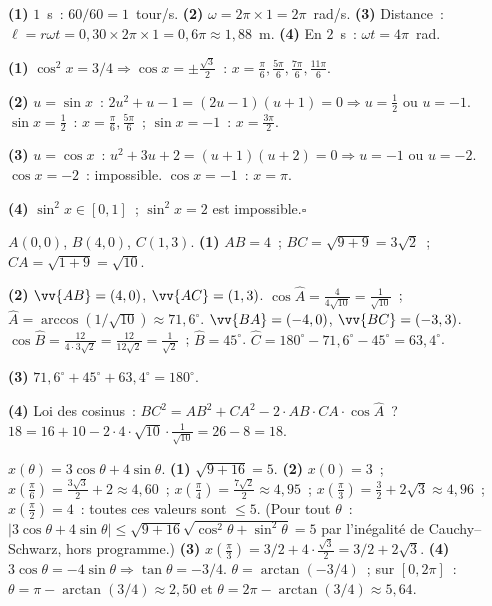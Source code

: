 
\textbf{(1)} $1$~s~: $60/60=1$~tour/s.
\textbf{(2)} $\omega=2\pi\times1=2\pi$~rad/s.
\textbf{(3)} Distance~: $\ell=r\omega t=0{,}30\times2\pi\times1=0{,}6\pi\approx1{,}88$~m.
\textbf{(4)} En $2$~s~: $\omega t=4\pi$~rad.


\textbf{(1)} $\cos^2x=3/4\Rightarrow\cos x=\pm\frac{\sqrt{3}}{2}$~:
$x=\frac{\pi}{6},\frac{5\pi}{6},\frac{7\pi}{6},\frac{11\pi}{6}$.

\textbf{(2)} $u=\sin x$~: $2u^2+u-1=(2u-1)(u+1)=0\Rightarrow u=\frac{1}{2}$ ou $u=-1$.
$\sin x=\frac{1}{2}$~: $x=\frac{\pi}{6},\frac{5\pi}{6}$~; $\sin x=-1$~: $x=\frac{3\pi}{2}$.

\textbf{(3)} $u=\cos x$~: $u^2+3u+2=(u+1)(u+2)=0\Rightarrow u=-1$ ou $u=-2$.
$\cos x=-2$~: impossible. $\cos x=-1$~: $x=\pi$.

\textbf{(4)} $\sin^2x\in[0,1]$~; $\sin^2x=2$ est impossible.\hfill$\square$


$A(0,0)$, $B(4,0)$, $C(1,3)$.
\textbf{(1)} $AB=4$~; $BC=\sqrt{9+9}=3\sqrt{2}$~; $CA=\sqrt{1+9}=\sqrt{10}$.

\textbf{(2)} $\vv{AB}=(4,0)$, $\vv{AC}=(1,3)$.
$\cos\hat{A}=\frac{4}{4\sqrt{10}}=\frac{1}{\sqrt{10}}$~; $\hat{A}=\arccos(1/\sqrt{10})\approx71{,}6^{\circ}$.
$\vv{BA}=(-4,0)$, $\vv{BC}=(-3,3)$.
$\cos\hat{B}=\frac{12}{4\cdot3\sqrt{2}}=\frac{12}{12\sqrt{2}}=\frac{1}{\sqrt{2}}$~; $\hat{B}=45^{\circ}$.
$\hat{C}=180^{\circ}-71{,}6^{\circ}-45^{\circ}=63{,}4^{\circ}$.

\textbf{(3)} $71{,}6^{\circ}+45^{\circ}+63{,}4^{\circ}=180^{\circ}$.\checkmark

\textbf{(4)} Loi des cosinus~: $BC^2=AB^2+CA^2-2\cdot AB\cdot CA\cdot\cos\hat{A}$~?
$18=16+10-2\cdot4\cdot\sqrt{10}\cdot\frac{1}{\sqrt{10}}=26-8=18$.\checkmark


$x(\theta)=3\cos\theta+4\sin\theta$.
\textbf{(1)} $\sqrt{9+16}=5$.
\textbf{(2)} $x(0)=3$~; $x(\frac\pi6)=\frac{3\sqrt3}{2}+2\approx4{,}60$~; $x(\frac\pi4)=\frac{7\sqrt2}{2}\approx4{,}95$~;
$x(\frac\pi3)=\frac32+2\sqrt3\approx4{,}96$~; $x(\frac\pi2)=4$~: toutes ces valeurs sont $\leq5$.\checkmark
(Pour tout $\theta$~: $|3\cos\theta+4\sin\theta|\leq\sqrt{9+16}\sqrt{\cos^2\theta+\sin^2\theta}=5$ par l'in\'egalit\'e de Cauchy--Schwarz, hors programme.)
\textbf{(3)} $x(\frac{\pi}{3})=3/2+4\cdot\frac{\sqrt{3}}{2}=3/2+2\sqrt{3}$.
\textbf{(4)} $3\cos\theta=-4\sin\theta\Rightarrow\tan\theta=-3/4$.
$\theta=\arctan(-3/4)$~; sur $[0,2\pi]$~: $\theta=\pi-\arctan(3/4)\approx2{,}50$ et $\theta=2\pi-\arctan(3/4)\approx5{,}64$.

